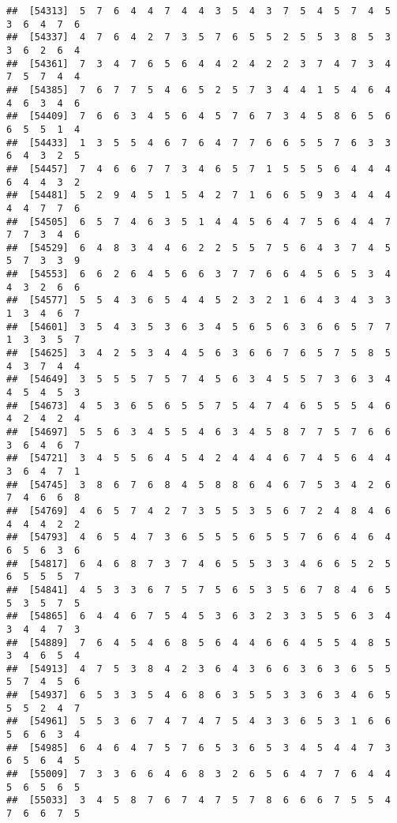 \documentclass[
]{book}
\begin{document}
\begin{verbatim}
##  [54313]  5  7  6  4  4  7  4  4  3  5  4  3  7  5  4  5  7  4  5  3  6  4  7  6
##  [54337]  4  7  6  4  2  7  3  5  7  6  5  5  2  5  5  3  8  5  3  3  6  2  6  4
##  [54361]  7  3  4  7  6  5  6  4  4  2  4  2  2  3  7  4  7  3  4  7  5  7  4  4
##  [54385]  7  6  7  7  5  4  6  5  2  5  7  3  4  4  1  5  4  6  4  4  6  3  4  6
##  [54409]  7  6  6  3  4  5  6  4  5  7  6  7  3  4  5  8  6  5  6  6  5  5  1  4
##  [54433]  1  3  5  5  4  6  7  6  4  7  7  6  6  5  5  7  6  3  3  6  4  3  2  5
##  [54457]  7  4  6  6  7  7  3  4  6  5  7  1  5  5  5  6  4  4  4  6  4  4  3  2
##  [54481]  5  2  9  4  5  1  5  4  2  7  1  6  6  5  9  3  4  4  4  4  4  7  7  6
##  [54505]  6  5  7  4  6  3  5  1  4  4  5  6  4  7  5  6  4  4  7  7  7  3  4  6
##  [54529]  6  4  8  3  4  4  6  2  2  5  5  7  5  6  4  3  7  4  5  5  7  3  3  9
##  [54553]  6  6  2  6  4  5  6  6  3  7  7  6  6  4  5  6  5  3  4  4  3  2  6  6
##  [54577]  5  5  4  3  6  5  4  4  5  2  3  2  1  6  4  3  4  3  3  1  3  4  6  7
##  [54601]  3  5  4  3  5  3  6  3  4  5  6  5  6  3  6  6  5  7  7  1  3  3  5  7
##  [54625]  3  4  2  5  3  4  4  5  6  3  6  6  7  6  5  7  5  8  5  4  3  7  4  4
##  [54649]  3  5  5  5  7  5  7  4  5  6  3  4  5  5  7  3  6  3  4  4  5  4  5  3
##  [54673]  4  5  3  6  5  6  5  5  7  5  4  7  4  6  5  5  5  4  6  4  2  4  2  4
##  [54697]  5  5  6  3  4  5  5  4  6  3  4  5  8  7  7  5  7  6  6  3  6  4  6  7
##  [54721]  3  4  5  5  6  4  5  4  2  4  4  4  6  7  4  5  6  4  4  3  6  4  7  1
##  [54745]  3  8  6  7  6  8  4  5  8  8  6  4  6  7  5  3  4  2  6  7  4  6  6  8
##  [54769]  4  6  5  7  4  2  7  3  5  5  3  5  6  7  2  4  8  4  6  4  4  4  2  2
##  [54793]  4  6  5  4  7  3  6  5  5  5  6  5  5  7  6  6  4  6  4  6  5  6  3  6
##  [54817]  6  4  6  8  7  3  7  4  6  5  5  3  3  4  6  6  5  2  5  6  5  5  5  7
##  [54841]  4  5  3  3  6  7  5  7  5  6  5  3  5  6  7  8  4  6  5  5  3  5  7  5
##  [54865]  6  4  4  6  7  5  4  5  3  6  3  2  3  3  5  5  6  3  4  3  4  4  7  3
##  [54889]  7  6  4  5  4  6  8  5  6  4  4  6  6  4  5  5  4  8  5  3  4  6  5  4
##  [54913]  4  7  5  3  8  4  2  3  6  4  3  6  6  3  6  3  6  5  5  5  7  4  5  6
##  [54937]  6  5  3  3  5  4  6  8  6  3  5  5  3  3  6  3  4  6  5  5  5  2  4  7
##  [54961]  5  5  3  6  7  4  7  4  7  5  4  3  3  6  5  3  1  6  6  5  6  6  3  4
##  [54985]  6  4  6  4  7  5  7  6  5  3  6  5  3  4  5  4  4  7  3  6  5  6  4  5
##  [55009]  7  3  3  6  6  4  6  8  3  2  6  5  6  4  7  7  6  4  4  5  6  5  6  5
##  [55033]  3  4  5  8  7  6  7  4  7  5  7  8  6  6  6  7  5  5  4  7  6  6  7  5

\end{verbatim}
\end{document}
